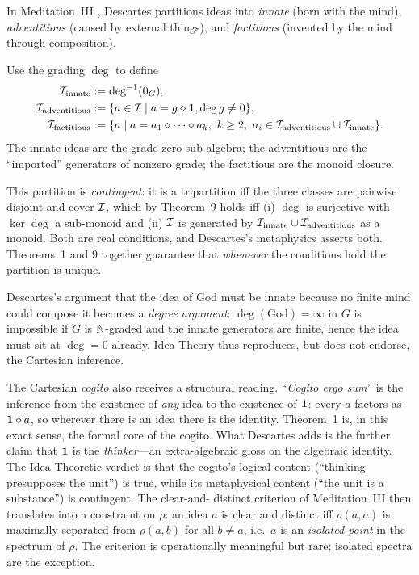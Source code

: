  In Meditation~III \cite{Descartes1641},
Descartes partitions ideas into \emph{innate} (born with the mind),
\emph{adventitious} (caused by external things), and \emph{factitious}
(invented by the mind through composition).

\formalclaim Use the grading $\deg$ to define
\begin{align*}
  \Ideas_{\mathrm{innate}}    &\defeq \deg^{-1}(0_G), \\
  \Ideas_{\mathrm{adventitious}} &\defeq \{a\in\Ideas \mid a=g\compose
       \unit, \deg g \neq 0\}, \\
  \Ideas_{\mathrm{factitious}} &\defeq \{a \mid a = a_1\compose\dots\compose
       a_k,\ k\ge 2,\ a_i \in \Ideas_{\mathrm{adventitious}}\cup
       \Ideas_{\mathrm{innate}}\}.
\end{align*}
The innate ideas are the grade-zero sub-algebra; the adventitious are the
``imported'' generators of nonzero grade; the factitious are the monoid
closure.

\formalstatus This partition is \emph{contingent}: it is a tripartition
iff the three classes are pairwise disjoint and cover $\mathcal{I}$, which by
Theorem~9 holds iff (i) $\deg$ is surjective with $\ker\deg$ a sub-monoid
and (ii) $\mathcal{I}$ is generated by $\mathcal{I}_{\mathrm{innate}}\cup
\mathcal{I}_{\mathrm{adventitious}}$ as a monoid. Both are real conditions,
and Descartes's metaphysics asserts both. Theorems~1 and 9 together
guarantee that \emph{whenever} the conditions hold the partition is
unique.

\litcomment Descartes's argument that the idea of God must be innate
because no finite mind could compose it becomes a \emph{degree
argument}: $\deg(\mathrm{God}) = \infty$ in $G$ is impossible if $G$ is
$\mathbb{N}$-graded and the innate generators are finite, hence the idea must
sit at $\deg = 0$ already. Idea Theory thus reproduces, but does not
endorse, the Cartesian inference.

The Cartesian \emph{cogito} also receives a structural reading.
``\emph{Cogito ergo sum}'' is the inference from the existence of
\emph{any} idea to the existence of $\mathbf{1}$: every $a$ factors as
$\mathbf{1}\mathbin{\diamond} a$, so wherever there is an idea there is the identity.
Theorem~1 is, in this exact sense, the formal core of the cogito. What
Descartes adds is the further claim that $\mathbf{1}$ is the
\emph{thinker}---an extra-algebraic gloss on the algebraic identity.
The Idea Theoretic verdict is that the cogito's logical content
(``thinking presupposes the unit'') is true, while its metaphysical
content (``the unit is a substance'') is contingent. The clear-and-
distinct criterion of Meditation~III then translates into a constraint
on $\rho$: an idea $a$ is clear and distinct iff $\rho(a,a)$ is
maximally separated from $\rho(a, b)$ for all $b\neq a$, i.e.\ $a$ is
an \emph{isolated point} in the spectrum of $\rho$. The criterion is
operationally meaningful but rare; isolated spectra are the exception.

